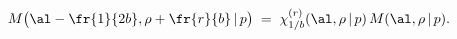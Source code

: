 \begin{equation}\label{funeqs'}
M\big(\al-\fr{1}{2b},\rho+\fr{r}{b}\,|\,p\big)\;=
\;\chi^{(r)}_{1/b}(\al,\rho\,|\,p)\,
M(\al,\rho\,|\,p).
\end{equation}

